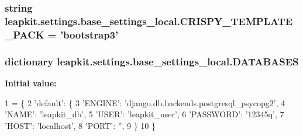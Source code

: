 \hypertarget{namespaceleapkit_1_1settings_1_1base__settings__local_ac8a2edc6a65e4bdd8907307ef05d4a74}{
\subsubsection[{C\-R\-I\-S\-P\-Y\-\_\-\-T\-E\-M\-P\-L\-A\-T\-E\-\_\-\-P\-A\-C\-K}]{\setlength{\rightskip}{0pt plus 5cm}string leapkit.\-settings.\-base\-\_\-settings\-\_\-local.\-C\-R\-I\-S\-P\-Y\-\_\-\-T\-E\-M\-P\-L\-A\-T\-E\-\_\-\-P\-A\-C\-K = 'bootstrap3'}}\label{namespaceleapkit_1_1settings_1_1base__settings__local_ac8a2edc6a65e4bdd8907307ef05d4a74}
\hypertarget{namespaceleapkit_1_1settings_1_1base__settings__local_acb55c116b89585e1223b543e2450f1d5}{
\subsubsection[{D\-A\-T\-A\-B\-A\-S\-E\-S}]{\setlength{\rightskip}{0pt plus 5cm}dictionary leapkit.\-settings.\-base\-\_\-settings\-\_\-local.\-D\-A\-T\-A\-B\-A\-S\-E\-S}}\label{namespaceleapkit_1_1settings_1_1base__settings__local_acb55c116b89585e1223b543e2450f1d5}
{\bfseries Initial value\-:}
\begin{DoxyCode}
1 = \{
2     \textcolor{stringliteral}{'default'}: \{
3         \textcolor{stringliteral}{'ENGINE'}: \textcolor{stringliteral}{'django.db.backends.postgresql\_psycopg2'},
4         \textcolor{stringliteral}{'NAME'}: \textcolor{stringliteral}{'leapkit\_db'},
5         \textcolor{stringliteral}{'USER'}: \textcolor{stringliteral}{'leapkit\_user'},
6         \textcolor{stringliteral}{'PASSWORD'}: \textcolor{stringliteral}{'12345q'},
7         \textcolor{stringliteral}{'HOST'}: \textcolor{stringliteral}{'localhost'},
8         \textcolor{stringliteral}{'PORT'}: \textcolor{stringliteral}{''},
9     \}
10 \}
\end{DoxyCode}
